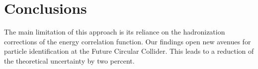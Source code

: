 \section{Conclusions}\label{sec:conclusions}

The main limitation of this approach is its reliance on the
hadronization corrections of the energy correlation function. Our
findings open new avenues for particle identification at the Future
Circular Collider. This leads to a reduction of the theoretical
uncertainty by two percent.


